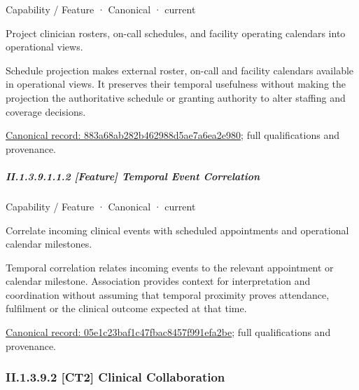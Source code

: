 \label{element:883a68ab282b462988d5ae7a6ea2e980}
{\small Capability / Feature · Canonical · current}\par

Project clinician rosters, on-call schedules, and facility operating calendars into operational views.



Schedule projection makes external roster, on-call and facility calendars available in operational views. It preserves their temporal usefulness without making the projection the authoritative schedule or granting authority to alter staffing and coverage decisions.


{\footnotesize \href{../../../../../../../continuum/strategy/capability/feature/883a68ab282b462988d5ae7a6ea2e980.md}{Canonical record: 883a68ab282b462988d5ae7a6ea2e980}; full qualifications and provenance.}\par
\subparagraph*{II.1.3.9.1.1.2 [Feature] Temporal Event Correlation}
\label{navigation:II.1.3.9.1.1.2}

\label{element:05e1c23baf1c47fbac8457f991efa2be}
{\small Capability / Feature · Canonical · current}\par

Correlate incoming clinical events with scheduled appointments and operational calendar milestones.



Temporal correlation relates incoming events to the relevant appointment or calendar milestone. Association provides context for interpretation and coordination without assuming that temporal proximity proves attendance, fulfilment or the clinical outcome expected at that time.


{\footnotesize \href{../../../../../../../continuum/strategy/capability/feature/05e1c23baf1c47fbac8457f991efa2be.md}{Canonical record: 05e1c23baf1c47fbac8457f991efa2be}; full qualifications and provenance.}\par
\subsubsection*{II.1.3.9.2 [CT2] Clinical Collaboration}
\label{navigation:II.1.3.9.2}

